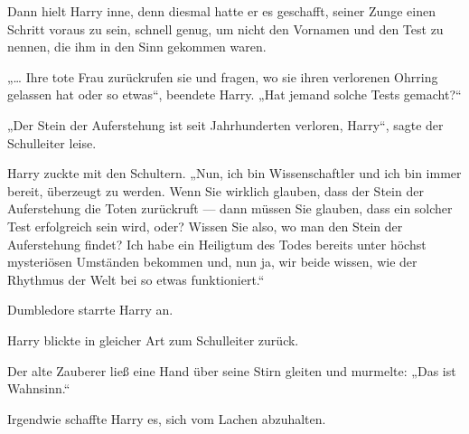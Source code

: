 Dann hielt Harry inne, denn diesmal hatte er es geschafft, seiner Zunge einen Schritt voraus zu sein, schnell genug, um nicht den Vornamen und den Test zu nennen, die ihm in den Sinn gekommen waren.

„… Ihre tote Frau zurückrufen sie und fragen, wo sie ihren verlorenen Ohrring gelassen hat oder so etwas“, beendete Harry.
„Hat jemand solche Tests gemacht?“

„Der Stein der Auferstehung ist seit Jahrhunderten verloren, Harry“, sagte der Schulleiter leise.

Harry zuckte mit den Schultern.
„Nun, ich bin Wissenschaftler und ich bin immer bereit, überzeugt zu werden. Wenn Sie wirklich glauben, dass der Stein der Auferstehung die Toten zurückruft — dann müssen Sie glauben, dass ein solcher Test erfolgreich sein wird, oder? Wissen Sie also, wo man den Stein der Auferstehung findet? Ich habe ein Heiligtum des Todes bereits unter höchst mysteriösen Umständen bekommen und, nun ja, wir beide wissen, wie der Rhythmus der Welt bei so etwas funktioniert.“

Dumbledore starrte Harry an.

Harry blickte in gleicher Art zum Schulleiter zurück.

Der alte Zauberer ließ eine Hand über seine Stirn gleiten und murmelte:
„Das ist Wahnsinn.“

Irgendwie schaffte Harry es, sich vom Lachen abzuhalten.

